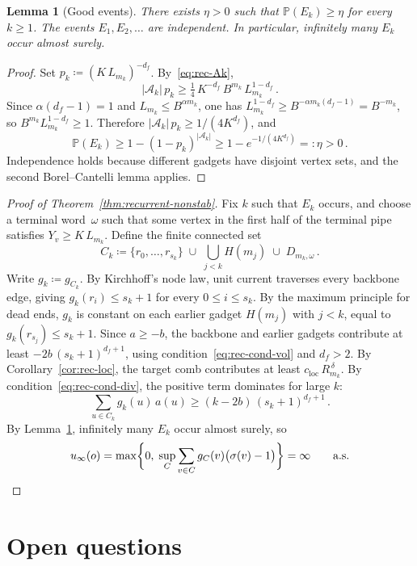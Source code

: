 \documentclass[11pt]{amsart}
\theoremstyle{plain}
\newtheorem{lemma}[theorem]{Lemma}
\theoremstyle{definition}
\renewcommand{\P}{\mathbb{P}}
\begin{document}
	\begin{lemma}[Good events]\label{lem:rec-good}
		There exists $\eta>0$ such that $\P(E_k)\geq\eta$ for every $k\geq 1$.  The events $E_1,E_2,\ldots$ are independent.  In particular, infinitely many $E_k$ occur almost surely.
	\end{lemma}
	
	\begin{proof}
		Set $p_k\coloneqq(K\,L_{m_k})^{-d_f}$.  By~\eqref{eq:rec-Ak},
		\[
		|\mathcal{A}_k|\,p_k
		\geq\tfrac{1}{4}\,K^{-d_f}\,
		B^{m_k}\,L_{m_k}^{1-d_f}\,.
		\]
		Since $\alpha(d_f{-}1)=1$ and $L_{m_k}\leq B^{\alpha m_k}$, one has $L_{m_k}^{1-d_f}\geq B^{-\alpha m_k(d_f-1)} =B^{-m_k}$, so $B^{m_k}L_{m_k}^{1-d_f}\geq 1$.  Therefore $|\mathcal{A}_k|\,p_k\geq 1/(4K^{d_f})$, and
		\[
		\P(E_k)
		\geq 1-(1-p_k)^{|\mathcal{A}_k|}
		\geq 1-e^{-1/(4K^{d_f})}
		=:\eta>0\,.
		\]
		Independence holds because different gadgets have disjoint vertex sets, and the second Borel--Cantelli lemma applies.
	\end{proof}
	
	\begin{proof}[Proof of Theorem~\ref{thm:recurrent-nonstab}]
		Fix $k$ such that $E_k$ occurs, and choose a terminal word~$\omega$ such that some vertex in the first half of the terminal pipe satisfies $Y_v\geq K\,L_{m_k}$.  Define the finite connected set
		\[
		C_k\coloneqq\{r_0,\ldots,r_{s_k}\}
		\;\cup\;\bigcup_{j<k}H(m_j)
		\;\cup\;D_{m_k,\omega}\,.
		\]
		Write $g_k\coloneqq g_{C_k}$.  By Kirchhoff's node law, unit current traverses every backbone edge, giving $g_k(r_i)\leq s_k{+}1$ for every $0\leq i\leq s_k$.  By the maximum principle for dead ends, $g_k$ is constant on each earlier gadget $H(m_j)$ with $j<k$, equal to $g_k(r_{s_j})\leq s_k{+}1$.  Since $a\geq -b$, the backbone and earlier gadgets contribute at least $-2b\,(s_k{+}1)^{d_f+1}$, using condition~\eqref{eq:rec-cond-vol} and $d_f>2$.  By Corollary~\ref{cor:rec-loc}, the target comb contributes at least $c_{\mathrm{loc}}\,R_{m_k}^{\,\delta}$.  By condition~\eqref{eq:rec-cond-div}, the positive term dominates for large $k$:
		\[
		\sum_{u\in C_k}g_k(u)\,a(u)\geq (k-2b)\,(s_k{+}1)^{d_f+1}\,.
		\]
		By Lemma~\ref{lem:rec-good}, infinitely many $E_k$ occur almost surely, so
		\[
		u_\infty(o)
		=\max\biggl\{0,\;\sup_C\sum_{v\in C} g_C(v)\bigl(\sigma(v)-1\bigr)\biggr\}
		=\infty\qquad\text{a.s.}\qedhere
		\]
	\end{proof}
	
	\section{Open questions}
	
\end{document}
